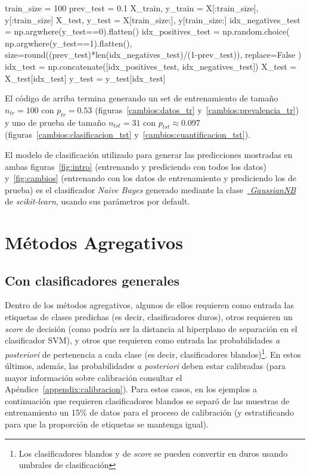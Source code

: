 \begin{python}
train_size = 100 prev_test = 0.1 X_train, y_train = X[:train_size],
y[:train_size] X_test, y_test = X[train_size:], y[train_size:]
idx_negatives_test = np.argwhere(y_test==0).flatten() idx_positives_test =
np.random.choice( np.argwhere(y_test==1).flatten(),
size=round((prev_test)*len(idx_negatives_test)/(1-prev_test)), replace=False )
idx_test = np.concatenate([idx_positives_test, idx_negatives_test]) X_test =
X_test[idx_test] y_test = y_test[idx_test]
\end{python}

El código de arriba termina generando un set de entrenamiento de tamaño
\(n_{tr}=100\) con \(p_{tr}=0.53\) (figuras~\ref{cambios:datos_tr}
y~\ref{cambios:prevalencia_tr}) y uno de prueba de tamaño \(n_{tst}=31\) con
\(p_{tst}\approx0.097\) (figuras~\ref{cambios:clasificacion_tst}
y~\ref{cambios:cuantificacion_tst}).

El modelo de clasificación utilizado para generar las predicciones mostradas en
ambas figuras~\ref{fig:intro} (entrenando y prediciendo con todos los datos)
y~\ref{fig:cambios} (entrenando con los datos de entrenamiento y prediciendo los
de prueba) es el clasificador {\it Naive Bayes\/} generado mediante la
clase~\href{https://scikit-learn.org/stable/modules/generated/sklearn.naive_bayes.GaussianNB.html}{{\it
GaussianNB}} de {\it scikit-learn}, usando sus parámetros por default.

\section{Métodos Agregativos}\label{estimacion:agregativos}

\subsection{Con clasificadores generales}\label{estimacion:generales}

Dentro de los métodos agregativos, algunos de ellos requieren como entrada las
etiquetas de clases predichas (es decir, clasificadores duros), otros requieren
un {\it score\/} de decisión (como podría ser la distancia al hiperplano de
separación en el clasificador SVM), y otros que requieren como entrada las
probabilidades {\it a posteriori\/} de pertenencia a cada clase (es decir,
clasificadores blandos)\footnote{Los clasificadores blandos y de {\it score\/}
se pueden convertir en duros usando umbrales de clasificación}. En estos
últimos, además, las probabilidades {\it a posteriori\/} deben estar calibradas
(para mayor información sobre calibración consultar el
Apéndice~\ref{appendix:calibracion}). Para estos casos, en los ejemplos a
continuación que requieren clasificadores blandos se separó de las muestras de
entrenamiento un 15\% de datos para el proceso de calibración (y estratificando
para que la proporción de etiquetas se mantenga igual).

